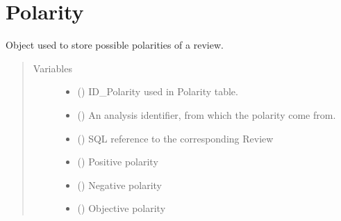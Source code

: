 \documentclass[letterpaper,10pt,english]{sphinxmanual}
\begin{document}
\section{Polarity}
\label{\detokenize{classes:polarity}}

\begin{fulllineitems}
\label{\detokenize{classes:loacore.classes.classes.Polarity}}
Object used to store possible polarities of a review.
\begin{quote}\begin{description}
\item[{Variables}] \leavevmode\begin{itemize}
\item {} 
 () \textendash{} ID\_Polarity used in Polarity table.

\item {} 
 () \textendash{} An analysis identifier, from which the polarity come from.

\item {} 
 () \textendash{} SQL reference to the corresponding Review

\item {} 
 () \textendash{} Positive polarity

\item {} 
 () \textendash{} Negative polarity

\item {} 
 () \textendash{} Objective polarity

\end{itemize}

\end{description}\end{quote}


\end{fulllineitems}
\end{document}
